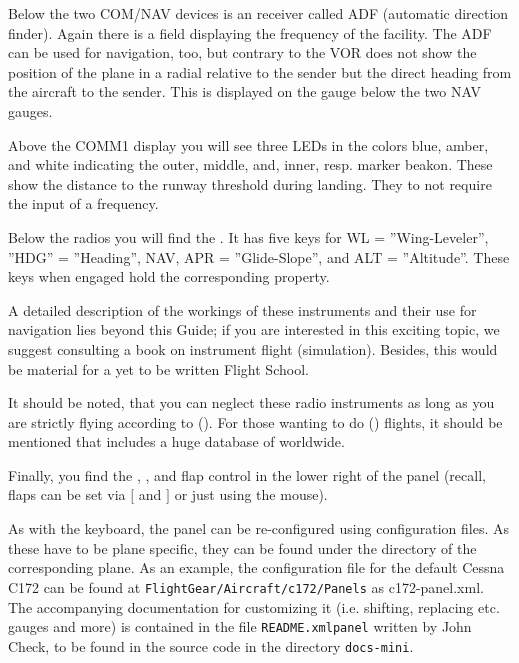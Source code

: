 Below the two COM/NAV devices is an  receiver called ADF (automatic direction
finder). Again there is a field displaying the frequency of the facility. The ADF can be
used for navigation, too, but contrary to the VOR does not show the position of the plane
in a radial relative to the sender but the direct heading from the aircraft to the
sender. This is displayed on the gauge below the two NAV gauges.

Above the COMM1 display you will see three LEDs in the colors blue, amber, and white
indicating the outer, middle, and, inner, resp. marker beakon. These show the distance to the runway
threshold during landing. They to not require the input of a frequency. 

Below the radios you will find the . It has five keys for WL = ''Wing-Leveler'', ''HDG'' = ''Heading'', NAV, APR = ''Glide-Slope'', and ALT = ''Altitude''. These keys when engaged hold the corresponding property. 

A detailed description of the workings of these instruments and their use for navigation
lies beyond this Guide; if you are interested in this exciting topic, we suggest
consulting a book on instrument flight (simulation). Besides, this would be material for
a yet to be written \FlightGear{} Flight School. 

It should be noted, that you can neglect these radio instruments as long as you are strictly flying according to  (). For those wanting to do  () flights, it should be mentioned that \FlightGear{} includes a huge database of  worldwide.

Finally, you find the , , and flap control in
the lower right of the panel (recall, flaps can be set via $[$ and $]$ or just using the mouse).

As with the keyboard, the panel can be re-configured using
configuration files. As these have to be plane specific, they can be found under the
directory of the corresponding plane. As an example, the configuration file for the
default Cessna C172 can be found at \texttt{FlightGear/Aircraft/c172/Panels} as
c172-panel.xml. The accompanying documentation for customizing it (i.e. shifting,
replacing etc. gauges and more) is contained in the file \texttt{README.xmlpanel} written by John Check,
to be found in the source code in the directory \texttt{docs-mini}.


